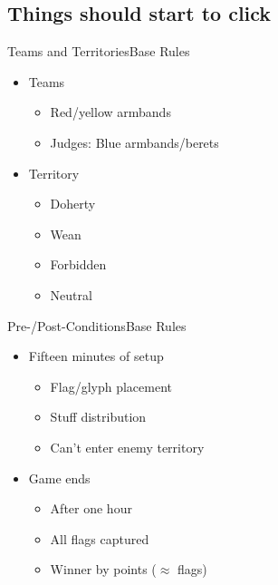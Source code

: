 \documentclass[17pt]{beamer}
\newcommand{\flavortext}[1]{}
\begin{document}
\subsection{Things should start to click}

\begin{frame}{Teams and Territories}{Base Rules}
  \begin{itemize}
  \item Teams
    \begin{itemize}
    \item Red/yellow armbands
    \item Judges: Blue armbands/berets
    \end{itemize}
  \item Territory
    \begin{itemize}
    \item Doherty
    \item Wean
    \item Forbidden
    \item Neutral
    \end{itemize}
  \end{itemize}
\end{frame}

\begin{frame}{Pre-/Post-Conditions}{Base Rules}
  \begin{itemize}
  \item Fifteen minutes of setup
    \begin{itemize}
    \item Flag/glyph placement
    \item Stuff distribution
    \item Can't enter enemy territory
    \end{itemize}
  \item Game ends
    \begin{itemize}
    \item After one hour
    \item All flags captured
    \item Winner by points ($\approx$ flags)
    \end{itemize}
  \end{itemize}
\end{frame}
\end{document}
